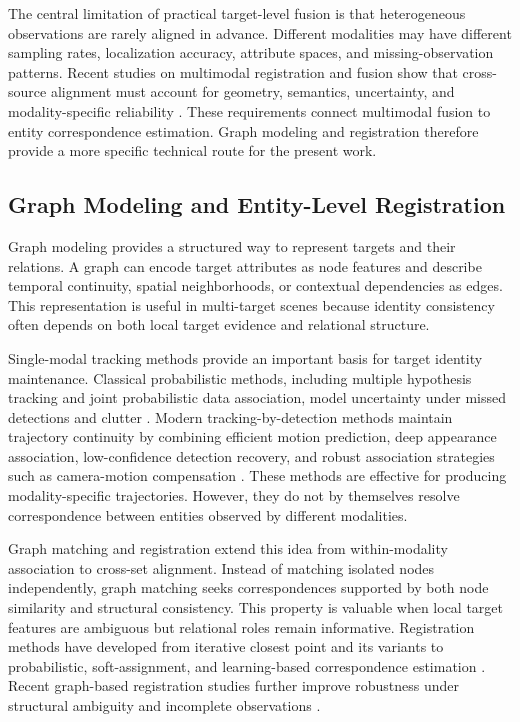 The central limitation of practical target-level fusion is that heterogeneous observations are rarely aligned in advance. Different modalities may have different sampling rates, localization accuracy, attribute spaces, and missing-observation patterns. Recent studies on multimodal registration and fusion show that cross-source alignment must account for geometry, semantics, uncertainty, and modality-specific reliability \cite{wu2024jointsemantic,chen2026multimodal,zhang2025optsar}. These requirements connect multimodal fusion to entity correspondence estimation. Graph modeling and registration therefore provide a more specific technical route for the present work.

\subsection{Graph Modeling and Entity-Level Registration}
Graph modeling provides a structured way to represent targets and their relations. A graph can encode target attributes as node features and describe temporal continuity, spatial neighborhoods, or contextual dependencies as edges. This representation is useful in multi-target scenes because identity consistency often depends on both local target evidence and relational structure.

Single-modal tracking methods provide an important basis for target identity maintenance. Classical probabilistic methods, including multiple hypothesis tracking and joint probabilistic data association, model uncertainty under missed detections and clutter \cite{reid1979mht,fortmann1983jpda}. Modern tracking-by-detection methods maintain trajectory continuity by combining efficient motion prediction, deep appearance association, low-confidence detection recovery, and robust association strategies such as camera-motion compensation \cite{bewley2016sort,wojke2017deepsort,zhang2022bytetrack,aharon2022botsort}. These methods are effective for producing modality-specific trajectories. However, they do not by themselves resolve correspondence between entities observed by different modalities.

Graph matching and registration extend this idea from within-modality association to cross-set alignment. Instead of matching isolated nodes independently, graph matching seeks correspondences supported by both node similarity and structural consistency. This property is valuable when local target features are ambiguous but relational roles remain informative. Registration methods have developed from iterative closest point and its variants \cite{besl1992icp,rusinkiewicz2001icpvariants,segal2009gicp} to probabilistic, soft-assignment, and learning-based correspondence estimation \cite{gold1996softassign,myronenko2010cpd,wang2019dcp,yew2020rpmnet}. Recent graph-based registration studies further improve robustness under structural ambiguity and incomplete observations \cite{fu2023deepgraphmatching,zhao2022graphreg,liu2024s2anet}.

